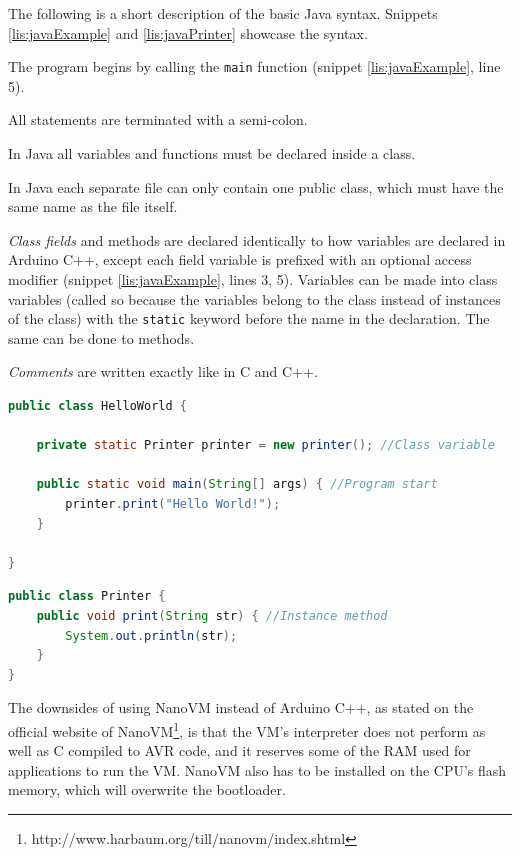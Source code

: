 The following is a short description of the basic Java syntax. 
Snippets \ref{lis:javaExample} and \ref{lis:javaPrinter} showcase the syntax.

The program begins by calling the \texttt{main} function (snippet \ref{lis:javaExample}, line 5).

All statements are terminated with a semi-colon.

In Java all variables and functions must be declared inside a class.

In Java each separate file can only contain one public class, which must have the same name as the file itself. 

\textit{Class fields} and methods are declared identically to how variables are declared in Arduino C++, except each field variable is prefixed with an optional access modifier (snippet \ref{lis:javaExample}, lines 3, 5).
Variables can be made into class variables (called so because the variables belong to the class instead of instances of the class) with the \texttt{static} keyword before the name in the declaration.
The same can be done to methods.

\textit{Comments} are written exactly like in C and C++.

\begin{lstlisting}[language=Java,label=lis:javaExample,caption=An example program written in Java.,firstnumber=1]
public class HelloWorld {

	private static Printer printer = new printer(); //Class variable
	
	public static void main(String[] args) { //Program start
		printer.print("Hello World!");
	}
	
}
\end{lstlisting}

\begin{lstlisting}[language=Java,label=lis:javaPrinter,caption=Printer class with one method written in Java.,firstnumber=1]
public class Printer {
	public void print(String str) { //Instance method
		System.out.println(str);
	}
}
\end{lstlisting}

The downsides of using NanoVM instead of Arduino C++, as stated on the official website of NanoVM\footnote{http://www.harbaum.org/till/nanovm/index.shtml}, is that the VM's interpreter does not perform as well as C compiled to AVR code, and it reserves some of the RAM used for applications to run the VM.
NanoVM also has to be installed on the CPU's flash memory, which will overwrite the bootloader.


